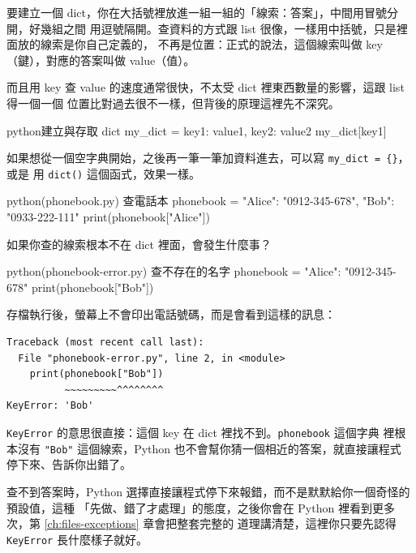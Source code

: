 要建立一個 dict，你在大括號裡放進一組一組的「線索：答案」，中間用冒號分開，好幾組之間
用逗號隔開。查資料的方式跟 list 很像，一樣用中括號，只是裡面放的線索是你自己定義的，
不再是位置：正式的說法，這個線索叫做 key（鍵），對應的答案叫做 value（值）。

而且用 key 查 value 的速度通常很快，不太受 dict 裡東西數量的影響，這跟 list 得一個一個
位置比對過去很不一樣，但背後的原理這裡先不深究。

\begin{code}{python}{建立與存取 dict}
my_dict = {key1: value1, key2: value2}
my_dict[key1]
\end{code}

如果想從一個空字典開始，之後再一筆一筆加資料進去，可以寫 \texttt{my\_dict = \{\}}，或是
用 \texttt{dict()} 這個函式，效果一樣。

\begin{example}{python}{(phonebook.py) 查電話本}
phonebook = {"Alice": "0912-345-678", "Bob": "0933-222-111"}
print(phonebook["Alice"])
\end{example}


如果你查的線索根本不在 dict 裡面，會發生什麼事？

\begin{example}{python}{(phonebook-error.py) 查不存在的名字}
phonebook = {"Alice": "0912-345-678"}
print(phonebook["Bob"])
\end{example}

存檔執行後，螢幕上不會印出電話號碼，而是會看到這樣的訊息：

\begin{verbatim}
Traceback (most recent call last):
  File "phonebook-error.py", line 2, in <module>
    print(phonebook["Bob"])
          ~~~~~~~~~^^^^^^^^
KeyError: 'Bob'
\end{verbatim}

\texttt{KeyError} 的意思很直接：這個 key 在 dict 裡找不到。\texttt{phonebook} 這個字典
裡根本沒有 \texttt{"Bob"} 這個線索，Python 也不會幫你猜一個相近的答案，就直接讓程式
停下來、告訴你出錯了。

查不到答案時，Python 選擇直接讓程式停下來報錯，而不是默默給你一個奇怪的預設值，這種
「先做、錯了才處理」的態度，之後你會在 Python 裡看到更多次，第 \ref{ch:files-exceptions} 章會把整套完整的
道理講清楚，這裡你只要先認得 \texttt{KeyError} 長什麼樣子就好。

